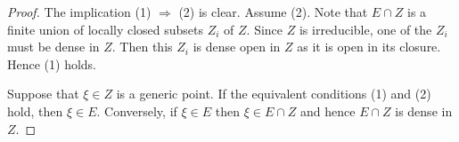 \documentclass[10pt,a4paper]{amsart}
\theoremstyle{plain}
\theoremstyle{definition}
\theoremstyle{remark}
\numberwithin{equation}{subsection}
\begin{document}
\begin{proof}
The implication (1) $\Rightarrow$ (2) is clear. Assume (2).
Note that $E \cap Z$ is a finite union of locally closed subsets
$Z_i$ of $Z$. Since $Z$ is irreducible, one of the $Z_i$ must
be dense in $Z$. Then this $Z_i$ is dense open in $Z$ as it is
open in its closure. Hence (1) holds.

\medskip\noindent
Suppose that $\xi \in Z$ is a generic point. If the equivalent conditions
(1) and (2) hold, then $\xi \in E$. Conversely, if $\xi \in E$ then
$\xi \in E \cap Z$ and hence $E \cap Z$ is dense in $Z$.
\end{proof}
\end{document}
